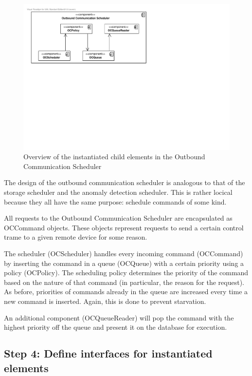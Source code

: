 \begin{figure}[H]
	\begin{centering}
		\includegraphics[width=\textwidth]{figs/add-it6-elements.pdf}
		\caption{Overview of the instantiated child elements in the Outbound
		Communication Scheduler}
		\label{fig:it6/elements}
	\end{centering}
\end{figure}

\npar The design of the outbound communication scheduler is analogous to that
of the storage scheduler and the anomaly detection scheduler. This is rather
locical because they all have the same purpose: schedule commands of some kind.

\npar All requests to the Outbound Communication Scheduler are encapsulated as
OCCommand objects. These objects represent requests to send a certain control
trame to a given remote device for some reason. 

\npar The scheduler (OCScheduler) handles every incoming command
(OCCommand) by inserting the command in a queue (OCQueue) with a
certain priority using a policy (OCPolicy). The scheduling policy
determines the priority of the command based on the nature of that command
(in particular, the reason for the request). As before, priorities of commands
already in the queue are increased every time a new command is inserted.
Again, this is done to prevent starvation.

\npar An additional component (OCQueueReader) will pop the command with the
highest priority off the queue and present it on the database for execution.

\subsection{Step 4: Define interfaces for instantiated elements}
\label{add:it6/interfaces}

